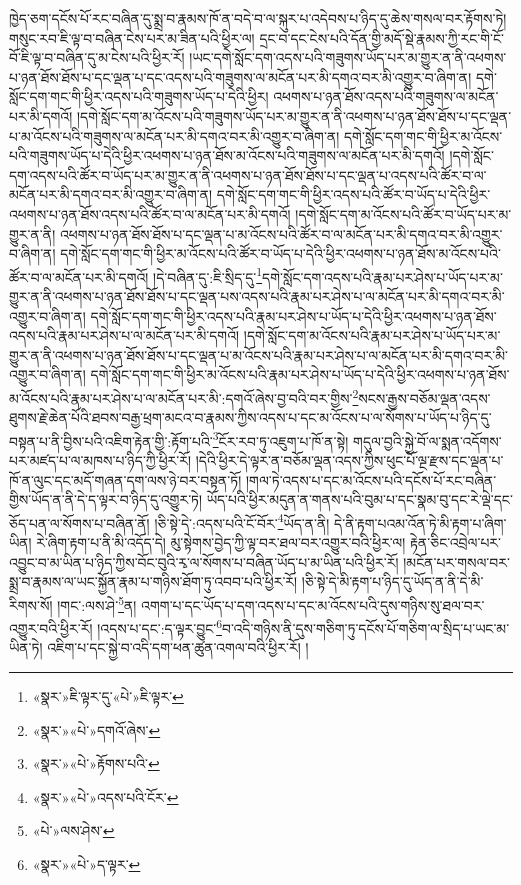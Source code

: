 ཁྱེད་ཅག་དངོས་པོ་རང་བཞིན་དུ་སྨྲ་བ་རྣམས་ཁོ་ན་བདེ་བ་ལ་སྐུར་པ་འདེབས་པ་ཉིད་དུ་ཆེས་གསལ་བར་རྟོགས་ཏེ། གསུང་རབ་ཇི་ལྟ་བ་བཞིན་ངེས་པར་མ་ཟིན་པའི་ཕྱིར་ལ། དྲང་བ་དང་ངེས་པའི་དོན་གྱི་མདོ་སྡེ་རྣམས་ཀྱི་རང་གི་ངོ་བོ་ཇི་ལྟ་བ་བཞིན་དུ་མ་ངེས་པའི་ཕྱིར་རོ། །ཡང་དགེ་སློང་དག་འདས་པའི་གཟུགས་ཡོད་པར་མ་གྱུར་ན་ནི་འཕགས་པ་ཉན་ཐོས་ཐོས་པ་དང་ལྡན་པ་དང་འདས་པའི་གཟུགས་ལ་མངོན་པར་མི་དགའ་བར་མི་འགྱུར་བ་ཞིག་ན། དགེ་སློང་དག་གང་གི་ཕྱིར་འདས་པའི་གཟུགས་ཡོད་པ་དེའི་ཕྱིར། འཕགས་པ་ཉན་ཐོས་འདས་པའི་གཟུགས་ལ་མངོན་པར་མི་དགའོ། །དགེ་སློང་དག་མ་འོངས་པའི་གཟུགས་ཡོད་པར་མ་གྱུར་ན་ནི་འཕགས་པ་ཉན་ཐོས་ཐོས་པ་དང་ལྡན་པ་མ་འོངས་པའི་གཟུགས་ལ་མངོན་པར་མི་དགའ་བར་མི་འགྱུར་བ་ཞིག་ན། དགེ་སློང་དག་གང་གི་ཕྱིར་མ་འོངས་པའི་གཟུགས་ཡོད་པ་དེའི་ཕྱིར་འཕགས་པ་ཉན་ཐོས་མ་འོངས་པའི་གཟུགས་ལ་མངོན་པར་མི་དགའོ། །དགེ་སློང་དག་འདས་པའི་ཚོར་བ་ཡོད་པར་མ་གྱུར་ན་ནི་འཕགས་པ་ཉན་ཐོས་ཐོས་པ་དང་ལྡན་པ་འདས་པའི་ཚོར་བ་ལ་མངོན་པར་མི་དགའ་བར་མི་འགྱུར་བ་ཞིག་ན། དགེ་སློང་དག་གང་གི་ཕྱིར་འདས་པའི་ཚོར་བ་ཡོད་པ་དེའི་ཕྱིར་འཕགས་པ་ཉན་ཐོས་འདས་པའི་ཚོར་བ་ལ་མངོན་པར་མི་དགའོ། །དགེ་སློང་དག་མ་འོངས་པའི་ཚོར་བ་ཡོད་པར་མ་གྱུར་ན་ནི། འཕགས་པ་ཉན་ཐོས་ཐོས་པ་དང་ལྡན་པ་མ་འོངས་པའི་ཚོར་བ་ལ་མངོན་པར་མི་དགའ་བར་མི་འགྱུར་བ་ཞིག་ན། དགེ་སློང་དག་གང་གི་ཕྱིར་མ་འོངས་པའི་ཚོར་བ་ཡོད་པ་དེའི་ཕྱིར་འཕགས་པ་ཉན་ཐོས་མ་འོངས་པའི་ཚོར་བ་ལ་མངོན་པར་མི་དགའོ། །དེ་བཞིན་དུ་:ཇི་སྲིད་དུ་\footnote{«སྣར་»ཇི་ལྟར་དུ་«པེ་»ཇི་ལྟར་}དགེ་སློང་དག་འདས་པའི་རྣམ་པར་ཤེས་པ་ཡོད་པར་མ་གྱུར་ན་ནི་འཕགས་པ་ཉན་ཐོས་ཐོས་པ་དང་ལྡན་པས་འདས་པའི་རྣམ་པར་ཤེས་པ་ལ་མངོན་པར་མི་དགའ་བར་མི་འགྱུར་བ་ཞིག་ན། དགེ་སློང་དག་གང་གི་ཕྱིར་འདས་པའི་རྣམ་པར་ཤེས་པ་ཡོད་པ་དེའི་ཕྱིར་འཕགས་པ་ཉན་ཐོས་འདས་པའི་རྣམ་པར་ཤེས་པ་ལ་མངོན་པར་མི་དགའོ། །དགེ་སློང་དག་མ་འོངས་པའི་རྣམ་པར་ཤེས་པ་ཡོད་པར་མ་གྱུར་ན་ནི་འཕགས་པ་ཉན་ཐོས་ཐོས་པ་དང་ལྡན་པ་མ་འོངས་པའི་རྣམ་པར་ཤེས་པ་ལ་མངོན་པར་མི་དགའ་བར་མི་འགྱུར་བ་ཞིག་ན། དགེ་སློང་དག་གང་གི་ཕྱིར་མ་འོངས་པའི་རྣམ་པར་ཤེས་པ་ཡོད་པ་དེའི་ཕྱིར་འཕགས་པ་ཉན་ཐོས་མ་འོངས་པའི་རྣམ་པར་ཤེས་པ་ལ་མངོན་པར་མི་:དགའོ་ཞེས་བྱ་བའི་བར་གྱིས་\footnote{«སྣར་»«པེ་»དགའོ་ཞེས་}སངས་རྒྱས་བཅོམ་ལྡན་འདས་ཐུགས་རྗེ་ཆེན་པོའི་ཐབས་བརྒྱ་ཕྲག་མངའ་བ་རྣམས་ཀྱིས་འདས་པ་དང་མ་འོངས་པ་ལ་སོགས་པ་ཡོད་པ་ཉིད་དུ་བསྟན་པ་ནི་བྱིས་པའི་འཇིག་རྟེན་གྱི་:རྟོག་པའི་\footnote{«སྣར་»«པེ་»རྟོགས་པའི་}ངོར་རབ་ཏུ་འཇུག་པ་ཁོ་ན་སྟེ། གདུལ་བྱའི་སྐྱེ་བོ་ལ་སྨན་འདོགས་པར་མཛད་པ་ལ་མཁས་པ་ཉིད་ཀྱི་ཕྱིར་རོ། །དེའི་ཕྱིར་དེ་ལྟར་ན་བཅོམ་ལྡན་འདས་ཀྱིས་ཕུང་པོ་ལྔ་རྫས་དང་ལྡན་པ་ཁོ་ན་ལུང་དང་མདོ་གཞན་དག་ལས་ཉེ་བར་བསྟན་ཏོ། །གལ་ཏེ་འདས་པ་དང་མ་འོངས་པའི་དངོས་པོ་རང་བཞིན་གྱིས་ཡོད་ན་ནི་དེ་ད་ལྟར་བ་ཉིད་དུ་འགྱུར་ཏེ། ཡོད་པའི་ཕྱིར་མདུན་ན་གནས་པའི་བུམ་པ་དང་སྣམ་བུ་དང་རེ་ལྡེ་དང་ཅོད་པན་ལ་སོགས་པ་བཞིན་ནོ། །ཅི་སྟེ་དེ་:འདས་པའི་ངོ་བོར་\footnote{«སྣར་»«པེ་»འདས་པའི་ངོར་}ཡོད་ན་ནི། དེ་ནི་རྟག་པའམ་འོན་ཏེ་མི་རྟག་པ་ཞིག་ཡིན། རེ་ཞིག་རྟག་པ་ནི་མི་འདོད་དེ། མུ་སྟེགས་བྱེད་ཀྱི་ལྟ་བར་ཐལ་བར་འགྱུར་བའི་ཕྱིར་ལ། རྟེན་ཅིང་འབྲེལ་པར་འབྱུང་བ་མ་ཡིན་པ་ཉིད་ཀྱིས་བོང་བུའི་རྭ་ལ་སོགས་པ་བཞིན་ཡོད་པ་མ་ཡིན་པའི་ཕྱིར་རོ། །མངོན་པར་གསལ་བར་སྨྲ་བ་རྣམས་ལ་ཡང་སྐྱོན་རྣམ་པ་གཉིས་ཐོག་ཏུ་འབབ་པའི་ཕྱིར་རོ། །ཅི་སྟེ་དེ་མི་རྟག་པ་ཉིད་དུ་ཡོད་ན་ནི་དེ་མི་རིགས་སོ། །གང་:ལས་ཤེ་\footnote{«པེ་»ལས་ཤེས་}ན། འགག་པ་དང་ཡོད་པ་དག་འདས་པ་དང་མ་འོངས་པའི་དུས་གཉིས་སུ་ཐལ་བར་འགྱུར་བའི་ཕྱིར་རོ། །འདས་པ་དང་:ད་ལྟར་བྱུང་\footnote{«སྣར་»«པེ་»ད་ལྟར་}བ་འདི་གཉིས་ནི་དུས་གཅིག་ཏུ་དངོས་པོ་གཅིག་ལ་སྲིད་པ་ཡང་མ་ཡིན་ཏེ། འཇིག་པ་དང་སྐྱེ་བ་འདི་དག་ཕན་ཚུན་འགལ་བའི་ཕྱིར་རོ། །
